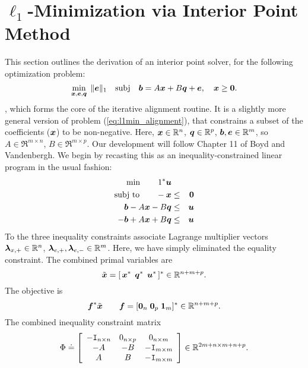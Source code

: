\section{$\ell_1$-Minimization via Interior Point Method}
\label{sec:ipm_derivation}

This section outlines the derivation of an interior point solver, for the following optimization problem:
\begin{equation}
\min_{{\boldsymbol{x}},\boldsymbol{e},{\boldsymbol q}}\;  \| \boldsymbol{e} \|_1 \quad \mathrm{subj} \quad \boldsymbol{b} = A {\boldsymbol{x}} + B {\boldsymbol q} + \boldsymbol{e}, \quad {\boldsymbol{x}} \ge \boldsymbol{0}.
\end{equation}, which forms the core of the iterative alignment routine.
It is a slightly more general version of problem (\ref{eq:l1min_alignment}),
that constrains a subset of the coefficients (${\boldsymbol{x}}$) to be non-negative. 
Here, ${\boldsymbol{x}} \in \mathbb R^n$, ${\boldsymbol q} \in \mathbb R^p$, $\boldsymbol{b}, \boldsymbol{e} \in
\mathbb R^m$, so $A \in \Re^{m \times n}$, $B \in \Re^{m\times p}$. Our development
will follow Chapter 11 of Boyd and Vandenbergh. We begin by recasting this as
an inequality-constrained linear program in the usual fashion:
\begin{eqnarray*}
\min \qquad 1^* \boldsymbol{u} \\
\textup{subj to} \qquad -{\boldsymbol{x}} &\le& \boldsymbol{0} \\
\boldsymbol{b} - A{\boldsymbol{x}} - B{\boldsymbol q} &\le& \boldsymbol{u} \\
-\boldsymbol{b} + A {\boldsymbol{x}} + B{\boldsymbol q} &\le& \boldsymbol{u}
\end{eqnarray*}
To the three inequality constraints associate Lagrange multiplier vectors $\boldsymbol{\lambda}_{x,+} \in \mathbb R^n$, $\boldsymbol{\lambda}_{e,+}, \boldsymbol{\lambda}_{e,-} \in \mathbb R^m$. Here, we have simply eliminated the equality constraint. The combined primal variables are 
\begin{equation}
\tilde {{\boldsymbol{x}}} = [ \, {\boldsymbol{x}}^* \;\, {\boldsymbol q}^* \;\, \boldsymbol{u}^* \, ]^* \in \mathbb R^{n+m+p}.
\end{equation}
The objective is
\begin{equation}
\boldsymbol{f}^* \tilde {{\boldsymbol{x}}} \qquad   \boldsymbol{f} = [ \boldsymbol{0}_n \; \boldsymbol{0}_p \; {\boldsymbol{1}}_m ]^* \in \mathbb R^{n+m+p}.
\end{equation}
The combined inequality constraint matrix 
\begin{equation}
\Phi \doteq \left[ \begin{array}{ccc} 
-\mathtt{I}_{n \times n} & 0_{n \times p} & 0_{n \times m} \\
-A &  -B & - \mathtt{I}_{m \times m} \\
A  &   B  &  - \mathtt{I}_{m \times m} \\
\end{array} \right] \in \mathbb R^{2m + n \times m + n + p}.
\end{equation}
